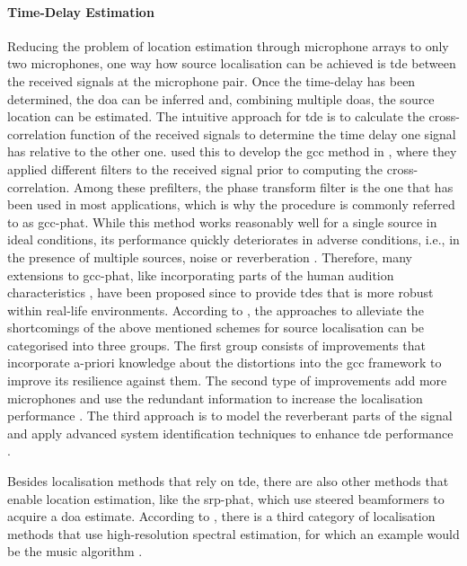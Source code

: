 \paragraph{Time-Delay Estimation}
 Reducing the problem of location estimation through microphone arrays to only two microphones, one way how source localisation can be achieved is \gls{tde} between the received signals at the microphone pair. Once the time-delay has been determined, the \gls{doa} can be inferred and, combining multiple \glspl{doa}, the source location can be estimated. The intuitive approach for \gls{tde} is to calculate the cross-correlation function of the received signals to determine the time delay one signal has relative to the other one. \citeauthor{Knapp1976} used this to develop the \gls{gcc} method in \cite{Knapp1976}, where they applied different filters to the received signal prior to computing the cross-correlation. Among these prefilters, the phase transform filter is the one that has been used in most applications, which is why the procedure is commonly referred to as \gls{gcc-phat}. While this method works reasonably well for a single source in ideal conditions, its performance quickly deteriorates in adverse conditions, i.e., in the presence of multiple sources, noise or reverberation \cite{Bedard1994,Champagne1996}. Therefore, many extensions to \gls{gcc-phat}, like incorporating parts of the human audition characteristics \cite{Wilson2006}, have been proposed since to provide \glspl{tde} that is more robust within real-life environments. 
According to \cite{Chen2006}, the approaches to alleviate the shortcomings of the above mentioned schemes for source localisation can be categorised into three groups. The first group consists of improvements that incorporate a-priori knowledge about the distortions into the \gls{gcc} framework to improve its resilience against them. The second type of improvements add more microphones and use the redundant information to increase the localisation performance \cite{Brandstein1996,Silverman1997}. The third approach is to model the reverberant parts of the signal and apply advanced system identification techniques to enhance \gls{tde} performance \cite{Huang1999}.

Besides localisation methods that rely on \gls{tde}, there are also other methods that enable location estimation, like the \gls{srp-phat}, which use steered beamformers to acquire a \gls{doa} estimate. According to \cite{DiBiase2001}, there is a third category of localisation methods that use high-resolution spectral estimation, for which an example would be the \gls{music} algorithm \cite{Schmidt1986}.

